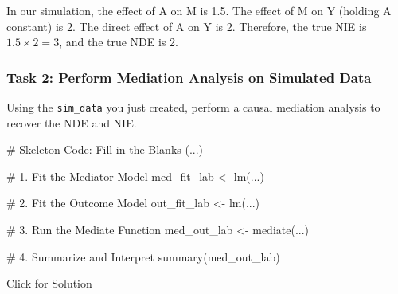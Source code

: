 \documentclass[
  10pt,
  letterpaper,
  DIV=11,
  numbers=noendperiod,
  oneside]{scrartcl}
\newenvironment{Shaded}{\begin{snugshade}}{\end{snugshade}}
\newcommand{\CommentTok}[1]{\textcolor[rgb]{0.37,0.37,0.37}{#1}}
\newcommand{\FunctionTok}[1]{\textcolor[rgb]{0.28,0.35,0.67}{#1}}
\newcommand{\NormalTok}[1]{\textcolor[rgb]{0.00,0.23,0.31}{#1}}
\newcommand{\OtherTok}[1]{\textcolor[rgb]{0.00,0.23,0.31}{#1}}
\begin{document}
\begin{tcolorbox}[enhanced jigsaw, colbacktitle=quarto-callout-tip-color!10!white, arc=.35mm, opacitybacktitle=0.6, bottomrule=.15mm, colback=white, rightrule=.15mm, bottomtitle=1mm, colframe=quarto-callout-tip-color-frame, toptitle=1mm, titlerule=0mm, coltitle=black, title=\textcolor{quarto-callout-tip-color}{\faLightbulb}\hspace{0.5em}{Tip}, toprule=.15mm, leftrule=.75mm, breakable, left=2mm, opacityback=0]

In our simulation, the effect of A on M is 1.5. The effect of M on Y
(holding A constant) is 2. The direct effect of A on Y is 2. Therefore,
the true NIE is \(1.5 \times 2 = 3\), and the true NDE is 2.

\end{tcolorbox}

\subsubsection{Task 2: Perform Mediation Analysis on Simulated
Data}\label{task-2-perform-mediation-analysis-on-simulated-data}

Using the \texttt{sim\_data} you just created, perform a causal
mediation analysis to recover the NDE and NIE.

\begin{Shaded}
\begin{Highlighting}[]
\CommentTok{\# Skeleton Code: Fill in the Blanks (...)}

\CommentTok{\# 1. Fit the Mediator Model}
\NormalTok{med\_fit\_lab }\OtherTok{\textless{}{-}} \FunctionTok{lm}\NormalTok{(...)}

\CommentTok{\# 2. Fit the Outcome Model}
\NormalTok{out\_fit\_lab }\OtherTok{\textless{}{-}} \FunctionTok{lm}\NormalTok{(...)}

\CommentTok{\# 3. Run the Mediate Function}
\NormalTok{med\_out\_lab }\OtherTok{\textless{}{-}} \FunctionTok{mediate}\NormalTok{(...)}

\CommentTok{\# 4. Summarize and Interpret}
\FunctionTok{summary}\NormalTok{(med\_out\_lab)}
\end{Highlighting}
\end{Shaded}

Click for Solution
\end{document}
